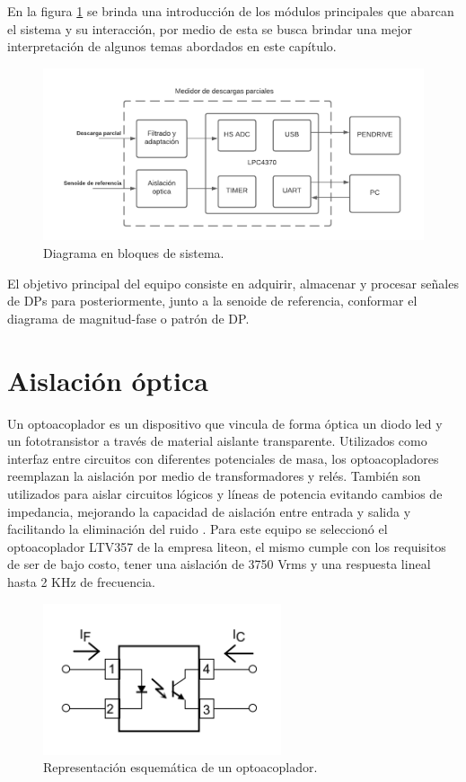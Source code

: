 En la figura \ref{fig:bloques} se brinda una introducción de los módulos principales que abarcan el sistema y su interacción, por medio de esta se busca brindar una mejor interpretación de algunos temas abordados en este capítulo.

\begin{figure}[ht]
	\centering
	\includegraphics[width=\textwidth]{./Figures/bloques.png}
	\caption{Diagrama en bloques de sistema.}
	\label{fig:bloques}
\end{figure}

El objetivo principal del equipo consiste en adquirir, almacenar y procesar señales de DPs para posteriormente, junto a la senoide de referencia, conformar el diagrama de magnitud-fase o patrón de DP.

\section{Aislación óptica}
Un optoacoplador es un dispositivo que vincula de forma óptica un diodo led y un fototransistor a través  de material aislante transparente. Utilizados como interfaz entre circuitos con diferentes potenciales de masa, los optoacopladores reemplazan la aislación por medio de transformadores y relés. También son utilizados para aislar circuitos lógicos y líneas de potencia evitando cambios de impedancia, mejorando la capacidad de aislación entre entrada y salida y facilitando la eliminación del ruido \citep{opto:appnote}. Para este equipo se seleccionó el optoacoplador LTV357 \citep{opto:ltv357} de la empresa liteon, el mismo cumple con los requisitos de ser de bajo costo, tener una aislación de 3750 Vrms y una respuesta lineal hasta 2 KHz de frecuencia.

\begin{figure}[ht]
	\centering
	\includegraphics[width=70mm]{./Figures/opto.png}
	\caption{Representación esquemática de un optoacoplador.}
	\label{fig:opto}
\end{figure}

